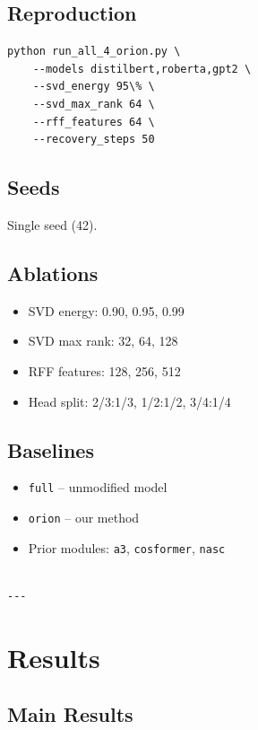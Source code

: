 \subsection{Reproduction}

\begin{lstlisting}
python run_all_4_orion.py \
    --models distilbert,roberta,gpt2 \
    --svd_energy 95\% \
    --svd_max_rank 64 \
    --rff_features 64 \
    --recovery_steps 50
\end{lstlisting}

\subsection{Seeds}

Single seed (42).

\subsection{Ablations}

\begin{itemize}
\item SVD energy: 0.90, 0.95, 0.99
\item SVD max rank: 32, 64, 128
\item RFF features: 128, 256, 512
\item Head split: 2/3:1/3, 1/2:1/2, 3/4:1/4

\end{itemize}
\subsection{Baselines}

\begin{itemize}
\item \texttt{full} -- unmodified model
\item \texttt{orion} -- our method
\item Prior modules: \texttt{a3}, \texttt{cosformer}, \texttt{nasc}
\end{itemize}
\begin{lstlisting}

---
\end{lstlisting}


\section{Results}

\subsection{Main Results}

